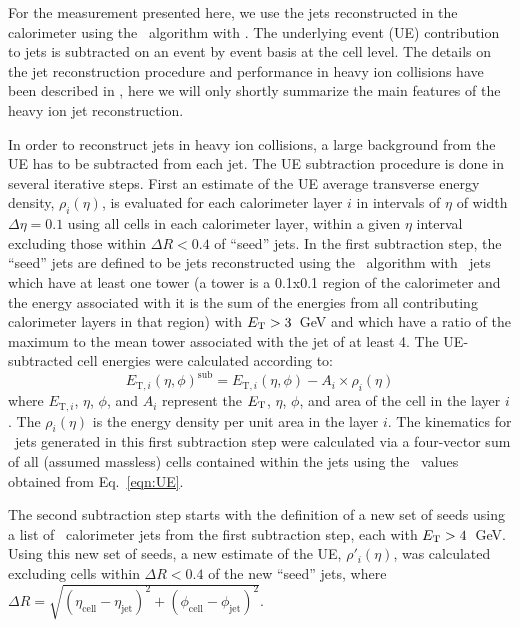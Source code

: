 
\label{Sec:JetRec}
For the measurement presented here, we use the jets reconstructed in the calorimeter 
using the \antikt\ algorithm \cite{Cacciari:2008gp} with \RFour.
The underlying event (UE) contribution to jets is subtracted on 
an event by event basis at the cell level. The details on the jet reconstruction 
procedure and performance in heavy ion collisions have been described in 
\cite{ATLAS-COM-PHYS-2011-1733}, here we will only shortly summarize the main 
features of the heavy ion jet reconstruction.

In order to reconstruct jets in heavy ion collisions, a large background from 
the UE has to be subtracted from each jet. 
The UE subtraction procedure is done in several iterative steps. 
First an estimate of the UE average transverse energy density, $\rho_i(\eta)$, 
is evaluated for each calorimeter layer $i$ in intervals of $\eta$ of width 
$\Delta \eta = 0.1$ using all cells in each calorimeter layer, within a given 
$\eta$ interval excluding those within $\Delta R < 0.4$ of ``seed'' jets. In the first 
subtraction step, the ``seed'' jets are defined to be jets reconstructed using the 
\antikt\ algorithm with \RTwo\ jets which have at 
least one tower  (a tower is a 0.1x0.1 region of the calorimeter and the energy
associated with it is the sum of the energies from all contributing calorimeter layers
in that region)
with $\mbox{$E_{\mathrm{T}}$} > 3$~GeV and which have a ratio of the maximum to 
the mean tower associated with the jet of at least 4. 
  The UE-subtracted cell energies  were calculated according to:
\begin{equation}
\label{eqn:UE}
E_{\mathrm{T},i}(\eta, \phi)^{\mathrm{sub}} = E_{\mathrm{T},i}(\eta, \phi) - A_i \times \rho_i(\eta) 
\end{equation}
where $E_{\mathrm{T},i}$, $\eta$, $\phi$,  and $A_i$ represent the $\mbox{$E_{\mathrm{T}}$}$, $\eta$, 
$\phi$, and area of the cell in the layer $i$. The $\rho_i(\eta)$ is the energy density per unit area in the layer $i$. The kinematics for \RTwo\ jets 
generated in this first subtraction step were calculated via a four-vector sum 
of all (assumed massless) cells contained within the jets using the \Et\ values 
obtained from Eq.~\ref{eqn:UE}.

The second subtraction step starts with the definition of a new set of 
seeds using a list of \RTwo\ calorimeter jets from the first 
subtraction step, each with $\mbox{$E_{\mathrm{T}}$} > 4$~GeV. Using this new set of 
seeds, a new estimate of the UE, $\rho'_i(\eta)$, was calculated excluding 
cells within $\Delta R < 0.4$ of the new ``seed'' jets, where $\Delta R = \sqrt{ 
(\eta_{\mathrm{cell}} - \eta_{\mathrm{jet}})^2 + (\phi_{\mathrm{cell}} - \phi_{\mathrm{jet}})^2}$.


